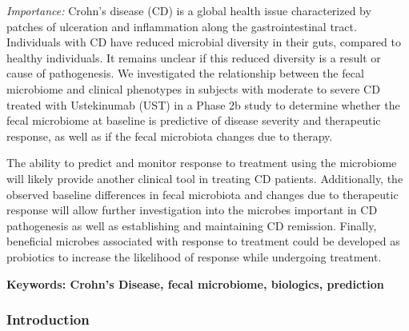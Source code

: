 \documentclass[11pt,]{article}
\begin{document}
\emph{Importance:} Crohn's disease (CD) is a global health issue
characterized by patches of ulceration and inflammation along the
gastrointestinal tract. Individuals with CD have reduced microbial
diversity in their guts, compared to healthy individuals. It remains
unclear if this reduced diversity is a result or cause of pathogenesis.
We investigated the relationship between the fecal microbiome and
clinical phenotypes in subjects with moderate to severe CD treated with
Ustekinumab (UST) in a Phase 2b study to determine whether the fecal
microbiome at baseline is predictive of disease severity and therapeutic
response, as well as if the fecal microbiota changes due to therapy.

The ability to predict and monitor response to treatment using the
microbiome will likely provide another clinical tool in treating CD
patients. Additionally, the observed baseline differences in fecal
microbiota and changes due to therapeutic response will allow further
investigation into the microbes important in CD pathogenesis as well as
establishing and maintaining CD remission. Finally, beneficial microbes
associated with response to treatment could be developed as probiotics
to increase the likelihood of response while undergoing treatment.

\textbf{Keywords: Crohn's Disease, fecal microbiome, biologics,
prediction}

\newpage

\subsubsection{Introduction}\label{introduction}
\end{document}
